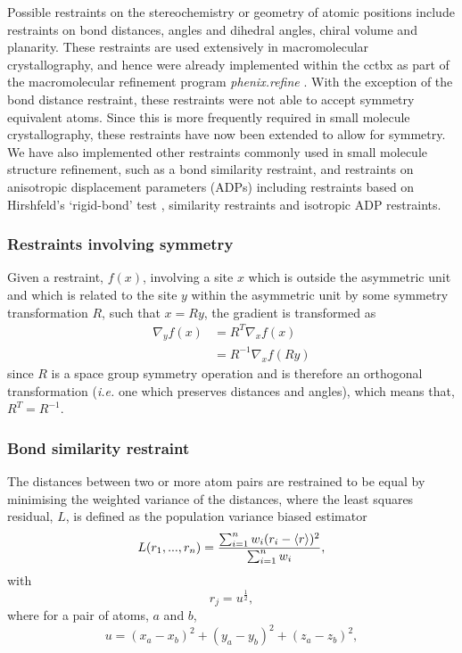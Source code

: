 \documentclass[pdf]{iucr}
\begin{document}
Possible restraints on the stereochemistry or geometry of atomic positions include restraints on bond distances, angles and dihedral angles, chiral volume and planarity. These restraints are used extensively in macromolecular crystallography, and hence were already implemented within the cctbx as part of the macromolecular refinement program \emph{phenix.refine} \cite{Afonine:ba5180}. With the exception of the bond distance restraint, these restraints were not able to accept symmetry equivalent atoms. Since this is more frequently required in small molecule crystallography, these restraints have now been extended to allow for symmetry. We have also implemented other restraints commonly used in small molecule structure refinement, such as a bond similarity restraint, and restraints on anisotropic displacement parameters (ADPs) including restraints based on Hirshfeld's `rigid-bond' test \cite{Hirshfeld:a12865}, similarity restraints and isotropic ADP restraints.



\subsubsection{Restraints involving symmetry}

Given a restraint, $f(x)$, involving a site $x$ which is outside the asymmetric unit and which is related to the site $y$ within the asymmetric unit by some symmetry transformation $R$, such that $x=Ry$, the gradient is transformed as
\begin{align}
\nabla_y f\left(x \right)  &= R^T \nabla_x f\left(x\right) \nonumber\\
&= R^{-1} \nabla_x f\left(R y\right)
\label{eqn:}
\end{align}
since $R$ is a space group symmetry operation and is therefore an orthogonal transformation (\emph{i.e.} one which preserves distances and angles), which means that, $R^T = R^{-1}$.



\subsubsection{Bond similarity restraint}

The distances between two or more atom pairs are restrained to be equal by minimising the weighted variance of the distances, where the least squares residual, $L$, is defined as the population variance biased estimator
\begin{equation}
\label{eqn:bond_similarity}
L(r_1,...,r_n) = \frac{\sum_{i = 1}^n {w_i(r_i - \left\langle r \right\rangle)^2}}
                      {\sum_{i = 1}^n {w_i}},
\end{equation}
with
\begin{equation*}
r_j = u^\frac{1}{2},
\end{equation*}
where for a pair of atoms, $a$ and $b$,
\begin{equation*}
u = (x_a - x_b)^2 + (y_a - y_b)^2 + (z_a - z_b)^2,
\end{equation*}
\end{document}

